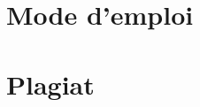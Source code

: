 \documentclass[a4paper,12pt]{report}
\begin{document}
\chapter{Mode d'emploi}

\chapter{Plagiat}
\end{document}
